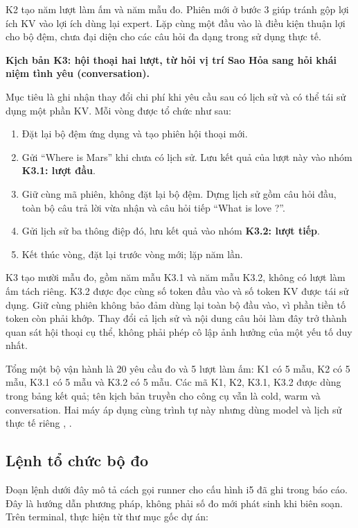 K2 tạo năm lượt làm ấm và năm mẫu đo. Phiên mới ở bước 3 giúp tránh gộp lợi ích KV vào lợi ích dùng lại expert. Lặp cùng một đầu vào là điều kiện thuận lợi cho bộ đệm, chưa đại diện cho các câu hỏi đa dạng trong sử dụng thực tế.

\textbf{Kịch bản K3: hội thoại hai lượt, từ hỏi vị trí Sao Hỏa sang hỏi khái niệm tình yêu (conversation).}

Mục tiêu là ghi nhận thay đổi chi phí khi yêu cầu sau có lịch sử và có thể tái sử dụng một phần KV. Mỗi vòng được tổ chức như sau:

\begin{enumerate}
\item Đặt lại bộ đệm ứng dụng và tạo phiên hội thoại mới.
\item Gửi “Where is Mars” khi chưa có lịch sử. Lưu kết quả của lượt này vào nhóm \textbf{K3.1: lượt đầu}.
\item Giữ cùng mã phiên, không đặt lại bộ đệm. Dựng lịch sử gồm câu hỏi đầu, toàn bộ câu trả lời vừa nhận và câu hỏi tiếp “What is love ?”.
\item Gửi lịch sử ba thông điệp đó, lưu kết quả vào nhóm \textbf{K3.2: lượt tiếp}.
\item Kết thúc vòng, đặt lại trước vòng mới; lặp năm lần.
\end{enumerate}

K3 tạo mười mẫu đo, gồm năm mẫu K3.1 và năm mẫu K3.2, không có lượt làm ấm tách riêng. K3.2 được đọc cùng số token đầu vào và số token KV được tái sử dụng. Giữ cùng phiên không bảo đảm dùng lại toàn bộ đầu vào, vì phần tiền tố token còn phải khớp. Thay đổi cả lịch sử và nội dung câu hỏi làm đây trở thành quan sát hội thoại cụ thể, không phải phép cô lập ảnh hưởng của một yếu tố duy nhất.

Tổng một bộ vận hành là 20 yêu cầu đo và 5 lượt làm ấm: K1 có 5 mẫu, K2 có 5 mẫu, K3.1 có 5 mẫu và K3.2 có 5 mẫu. Các mã K1, K2, K3.1, K3.2 được dùng trong bảng kết quả; tên kịch bản truyền cho công cụ vẫn là cold, warm và conversation. Hai máy áp dụng cùng trình tự này nhưng dùng model và lịch sử thực tế riêng \cite{exp_phase1_i5}, \cite{exp_phase1_i7}.

\subsection{Lệnh tổ chức bộ đo}

Đoạn lệnh dưới đây mô tả cách gọi runner cho cấu hình i5 đã ghi trong báo cáo. Đây là hướng dẫn phương pháp, không phải số đo mới phát sinh khi biên soạn. Trên terminal, thực hiện từ thư mục gốc dự án:


